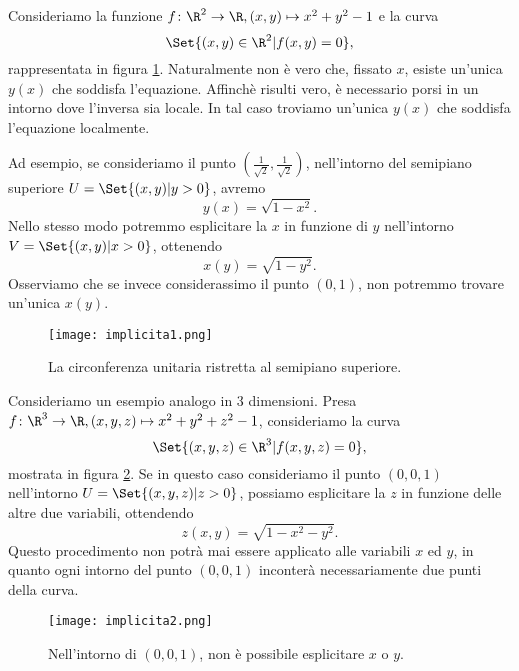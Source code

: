 \begin{ese}
	Consideriamo la funzione \(f\colon\R^2\to\R,(x,y)\mapsto x^2+y^2-1\) e la curva
	\[
		\Set{(x,y)\in\R^2 | f(x,y)=0},
	\]
	rappresentata in figura \ref{fig:implicita1}.
	Naturalmente non è vero che, fissato \(x\), esiste un'unica \(y(x)\) che soddisfa l'equazione. Affinchè risulti vero, è necessario porsi in un intorno dove l'inversa sia locale.
	In tal caso troviamo un'unica \(y(x)\) che soddisfa l'equazione localmente.

	Ad esempio, se consideriamo il punto \(\left(\frac{1}{\sqrt{2}},\frac{1}{\sqrt{2}}\right)\), nell'intorno del semipiano superiore \(U=\Set{(x,y) | y>0}\), avremo
	\[
		y(x)=\sqrt{1-x^2}.
	\]
	Nello stesso modo potremmo esplicitare la \(x\) in funzione di \(y\) nell'intorno \(V=\Set{(x,y) | x>0}\), ottenendo
	\[
		x(y)=\sqrt{1-y^2}.
	\]
	Osserviamo che se invece considerassimo il punto \((0,1)\), non potremmo trovare un'unica \(x(y)\).
\end{ese}

\begin{figure}[tp]
	\begin{centering}
		\texttt{[image: implicita1.png]}
		\caption{La circonferenza unitaria ristretta al semipiano superiore.}
		\label{fig:implicita1}
	\end{centering}
\end{figure}

\begin{ese}
	Consideriamo un esempio analogo in \(3\) dimensioni.
	Presa \(f\colon\R^3\to\R,(x,y,z)\mapsto x^2+y^2+z^2-1\), consideriamo la curva
	\[
		\Set{(x,y,z)\in\R^3 | f(x,y,z)=0},
	\]
	mostrata in figura \ref{fig:implicita2}.
	Se in questo caso consideriamo il punto \((0,0,1)\) nell'intorno \(U=\Set{(x,y,z) | z>0}\), possiamo esplicitare la \(z\) in funzione delle altre due variabili, ottendendo
	\[
		z(x,y)=\sqrt{1-x^2-y^2}.
	\]
	Questo procedimento non potrà mai essere applicato alle variabili \(x\) ed \(y\), in quanto ogni intorno del punto \((0,0,1)\) inconterà necessariamente due punti della curva.
\end{ese}

\begin{figure}[tp]
	\begin{centering}
		\texttt{[image: implicita2.png]}
		\caption{Nell'intorno di \((0,0,1)\), non è possibile esplicitare \(x\) o \(y\).}
		\label{fig:implicita2}
	\end{centering}
\end{figure}


